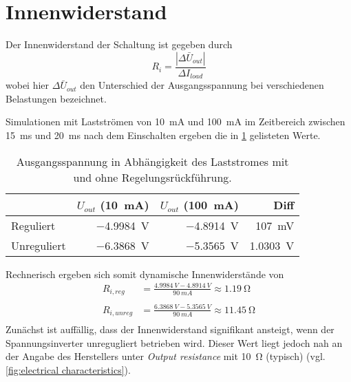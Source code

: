 	\section{Innenwiderstand}
		Der Innenwiderstand der Schaltung ist gegeben durch
		\begin{equation}
			R_i = \frac{|\Delta \bar{U}_{out}|}{\Delta I_{load}}
			\label{eq:innenwiderstand}
		\end{equation}
		wobei hier \(\Delta \bar{U}_{out}\) den Unterschied der Ausgangsspannung bei verschiedenen Belastungen bezeichnet.\par
		Simulationen mit Lastströmen von \SI{10}{mA} und \SI{100}{mA} im Zeitbereich zwischen \SI{15}{ms} und \SI{20}{ms} nach dem Einschalten
		ergeben die in \cref{tab:innenwiderstaende} gelisteten Werte.
		\begin{table}[h]
			\caption[Ausgangsspannung in Abhängigkeit des Laststromes mit und ohne Regelungsrückführung]{Ausgangsspannung in Abhängigkeit des Laststromes mit und ohne Regelungsrückführung.}
			\centering
			\begin{tabular}{@{}lrrr@{}}%
				\toprule
				&\(U_{out}\) (\SI{10}{mA})	&\(U_{out}\) (\SI{100}{mA})& Diff\\
				\midrule
				Reguliert		&\SI{-4,9984}{V}&\SI{-4,8914}{V}&\SI{107}{mV}\\
				Unreguliert		&\SI{-6,3868}{V}&\SI{-5,3565}{V}&\SI{1,0303}{V}\\
				\bottomrule
			\end{tabular}
			\label{tab:innenwiderstaende}
		\end{table}\par
		Rechnerisch ergeben sich somit dynamische Innenwiderstände von
		\begin{align}
			R_{i,reg} &= \frac{\SI{4,9984}{V} - \SI{4,8914}{V}}{\SI{90}{mA}} \approx \SI{1,19}{\ohm} \nonumber \\
			\\
			R_{i,unreg} &= \frac{\SI{6,3868}{V} - \SI{5,3565}{V}}{\SI{90}{mA}} \approx \SI{11,45}{\ohm} \nonumber \\
			\label{eq:innenwiderstand gerechnet}
		\end{align}
		Zunächst ist auffällig, dass der Innenwiderstand signifikant ansteigt, wenn der Spannungsinverter unregugliert betrieben wird.
		Dieser Wert liegt jedoch nah an der Angabe des Herstellers unter \textit{Output resistance} mit \SI{10}{\ohm} (typisch) (vgl. \cref{fig:electrical characteristics}).
